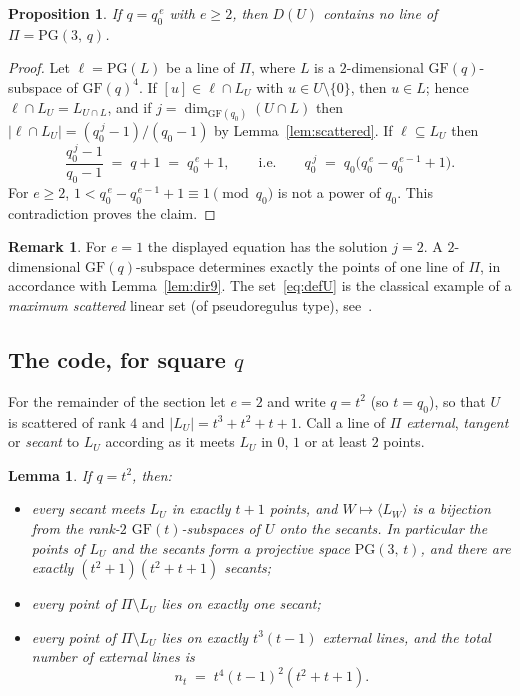 \documentclass[12pt]{article}
\newtheorem{lem}[thm]{Lemma}
\newtheorem{prop}[thm]{Proposition}
\theoremstyle{definition}
\newtheorem{rem}[thm]{Remark}
\numberwithin{equation}{section}
\newcommand{\GF}[1]{\mathrm{GF}(#1)}
\newcommand{\PG}[2]{\mathrm{PG}(#1,\,#2)}
\newcommand{\PGv}[1]{\mathrm{PG}(#1)}
\begin{document}
\begin{prop}\label{prop:linefree}
If $q=q_0^{\,e}$ with $e\geq2$, then $D(U)$ contains no line of $\Pi=\PG{3}{q}$.  
\end{prop}

\begin{proof}
Let $\ell=\PGv{L}$ be a line of $\Pi$, where $L$ is a $2$-dimensional $\GF{q}$-subspace of $\GF{q}^4$.  If $[u]\in\ell\cap L_U$ with $u\in U\setminus\{0\}$, then $u\in L$; hence $\ell\cap L_U=L_{U\cap L}$, and if $j=\dim_{\GF{q_0}}(U\cap L)$ then $|\ell\cap L_U|=(q_0^{\,j}-1)/(q_0-1)$ by Lemma~\ref{lem:scattered}. If $\ell\subseteq L_U$ then
\[
  \frac{q_0^{\,j}-1}{q_0-1}\;=\;q+1\;=\;q_0^{\,e}+1, \qquad\text{i.e.}\qquad q_0^{\,j}\;=\;q_0\bigl(q_0^{\,e}-q_0^{\,e-1}+1\bigr).
\]
For $e\geq2$, $1<q_0^{\,e}-q_0^{\,e-1}+1 \equiv 1 \pmod q_0$ is not a power of $q_0$.  This contradiction proves the claim.
\end{proof}


\begin{rem}
For $e=1$ the displayed equation has the solution $j=2$. A $2$-dimensional $\GF{q}$-subspace determines exactly the points of one line of $\Pi$, in accordance with Lemma~\ref{lem:dir9}.  The set~\eqref{eq:defU} is the classical example of a \emph{maximum scattered} linear set (of pseudoregulus type), see~\cite{MR1772204,LMPT14,MR2684078}.
\end{rem}

\subsection*{The code, for square $q$}

For the remainder of the section let $e=2$ and write $q=t^{2}$ (so $t=q_0$), so that $U$ is scattered of rank $4$ and $|L_U|=t^{3}+t^{2}+t+1$.  Call a line of $\Pi$ \textit{external}, \textit{tangent} or \textit{secant} to $L_U$ according as it meets $L_U$ in $0$, $1$ or at least $2$ points.

\begin{lem}\label{lem:secants}
If $q=t^2$, then:
\begin{itemize}
\item[(i)] every secant meets $L_U$ in exactly $t+1$ points, and $W\mapsto\langle L_W\rangle$ is a bijection from the rank-$2$ $\GF{t}$-subspaces of $U$ onto the secants. In particular the points of $L_U$ and the secants form a projective space $\PG{3}{t}$, and there are exactly $(t^{2}+1)(t^{2}+t+1)$ secants; \item[(ii)] every point of $\Pi\setminus L_U$ lies on exactly one secant;
\item[(iii)] every point of $\Pi\setminus L_U$ lies on exactly $t^{3}(t-1)$ external lines, and the total number of external lines is
\[
  n_t \;=\; t^{4}(t-1)^{2}(t^{2}+t+1).
\]
\end{itemize}
\end{lem}
\end{document}
